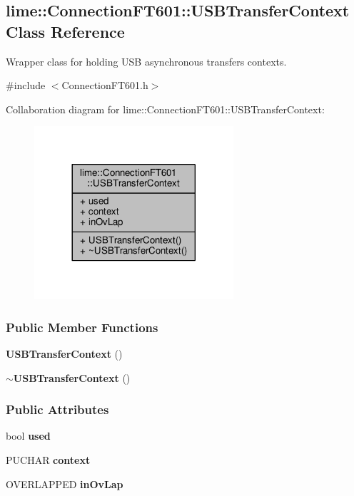 \subsection{lime\+:\+:Connection\+F\+T601\+:\+:U\+S\+B\+Transfer\+Context Class Reference}
\label{classlime_1_1ConnectionFT601_1_1USBTransferContext}


Wrapper class for holding U\+SB asynchronous transfers contexts.  




{\ttfamily \#include $<$Connection\+F\+T601.\+h$>$}



Collaboration diagram for lime\+:\+:Connection\+F\+T601\+:\+:U\+S\+B\+Transfer\+Context\+:
\nopagebreak
\begin{figure}[H]
\begin{center}
\leavevmode
\includegraphics[width=209pt]{d0/da9/classlime_1_1ConnectionFT601_1_1USBTransferContext__coll__graph}
\end{center}
\end{figure}
\subsubsection*{Public Member Functions}
\begin{DoxyCompactItemize}
\item 
{\bf U\+S\+B\+Transfer\+Context} ()
\item 
{\bf $\sim$\+U\+S\+B\+Transfer\+Context} ()
\end{DoxyCompactItemize}
\subsubsection*{Public Attributes}
\begin{DoxyCompactItemize}
\item 
bool {\bf used}
\item 
P\+U\+C\+H\+AR {\bf context}
\item 
O\+V\+E\+R\+L\+A\+P\+P\+ED {\bf in\+Ov\+Lap}
\end{DoxyCompactItemize}


